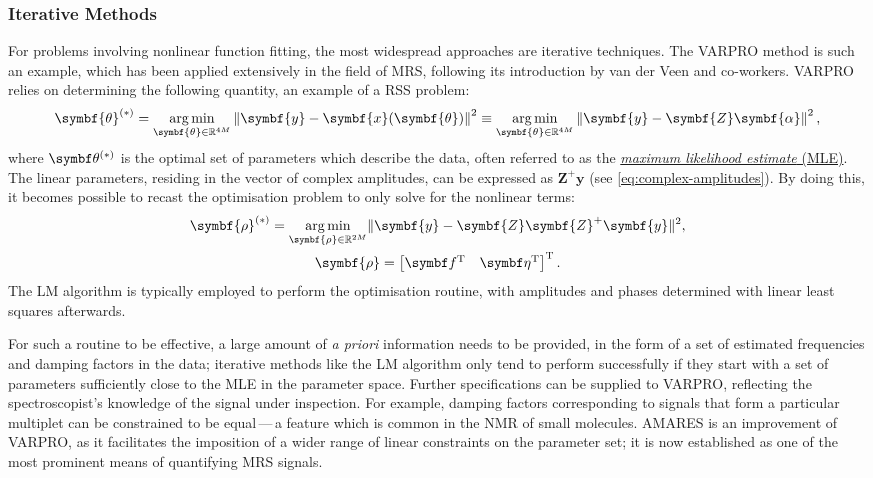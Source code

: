 \subsubsection{Iterative Methods}
For problems involving nonlinear function fitting, the most widespread approaches
are iterative techniques. The \ac{VARPRO} method\cite{Golub1973} is such an
example, which has been applied extensively in the field of \ac{MRS}, following
its introduction by van der Veen and
co-workers\cite{VanDerVeen1988,Decannierec1994}. \ac{VARPRO}
relies on determining the following quantity, an example of a \ac{RSS} problem:
\begin{equation}
    \symbf{\theta}^{(*)} = \argmin_{\symbf{\theta} \in \mathbb{R}^{4M}}
        \left \lVert \symbf{y} - \symbf{x}(\symbf{\theta}) \right \rVert^2 \equiv
        \argmin_{\symbf{\theta} \in \mathbb{R}^{4M}} \left \lVert \symbf{y} - \symbf{Z}\symbf{\alpha} \right \rVert^2,
\end{equation}
where $\bthstar$ is the optimal set of parameters which describe the data,
often referred to as the \ul{\emph{maximum likelihood estimate} (MLE)}.
The linear parameters, residing in the vector of complex amplitudes, can be
expressed as $\symbf{Z}^+\symbf{y}$ (see \cref{eq:complex-amplitudes}). By doing
this, it becomes possible to recast the optimisation problem to only solve for
the nonlinear terms:
\begin{subequations}
    \begin{gather}
        \symbf{\rho}^{(*)} =
            \argmin_{\symbf{\rho} \in \mathbb{R}^{2M}}
            \lVert \symbf{y} - \symbf{Z}\symbf{Z}^+\symbf{y} \rVert^2,\\
        \symbf{\rho} =
        \begin{bmatrix}
            \bdf\T & \bdeta\T
        \end{bmatrix}\T.
    \end{gather}
\end{subequations}
The \ac{LM} algorithm\cite{Levenberg1944, Marquardt1963} is
typically employed to perform the optimisation routine, with amplitudes and
phases determined with linear least squares afterwards.

For such a routine to be effective, a large amount of \textit{a priori}
information needs to be provided, in the form of a set of estimated frequencies
and damping factors in the data; iterative methods like the \ac{LM} algorithm
only tend to perform successfully if they start with a set of parameters
sufficiently close to the \ac{MLE} in the parameter space.
Further specifications can be supplied to \ac{VARPRO}, reflecting the
spectroscopist's knowledge of the signal under inspection. For example, damping
factors corresponding to signals that form a particular multiplet can be
constrained to be equal\,---\,a feature which is common in the \ac{NMR} of
small molecules. \Ac{AMARES} is an improvement of \ac{VARPRO}, as it
facilitates the imposition of a wider range of linear constraints on the
parameter set\cite{Vanhamme1997}; it is now established as one of the most
prominent means of quantifying \ac{MRS} signals.

